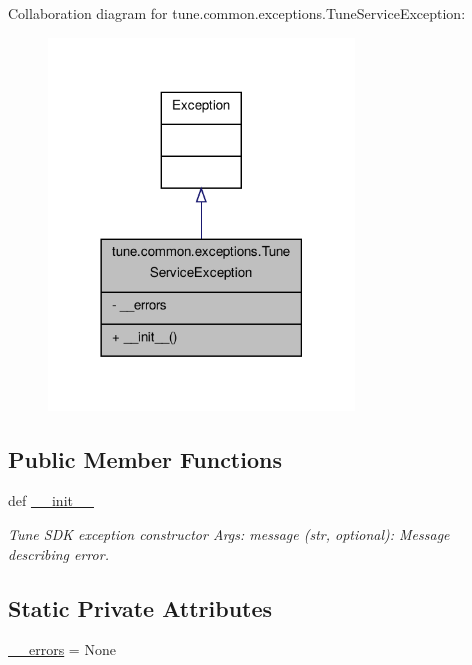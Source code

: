 Collaboration diagram for tune.\-common.\-exceptions.\-Tune\-Service\-Exception\-:
\nopagebreak
\begin{figure}[H]
\begin{center}
\leavevmode
\includegraphics[width=230pt]{classtune_1_1common_1_1exceptions_1_1TuneServiceException__coll__graph}
\end{center}
\end{figure}
\subsection*{Public Member Functions}
\begin{DoxyCompactItemize}
\item 
def \hyperlink{classtune_1_1common_1_1exceptions_1_1TuneServiceException_a2bb9ebc50e8b82d8f568b1a2b3c96572}{\-\_\-\-\_\-init\-\_\-\-\_\-}
\begin{DoxyCompactList}\small\item\em Tune S\-D\-K exception constructor Args\-: message (str, optional)\-: Message describing error. \end{DoxyCompactList}\end{DoxyCompactItemize}
\subsection*{Static Private Attributes}
\begin{DoxyCompactItemize}
\item 
\hyperlink{classtune_1_1common_1_1exceptions_1_1TuneServiceException_af7c571cf3406ac91701b8227b6cf261c}{\-\_\-\-\_\-errors} = None
\end{DoxyCompactItemize}


